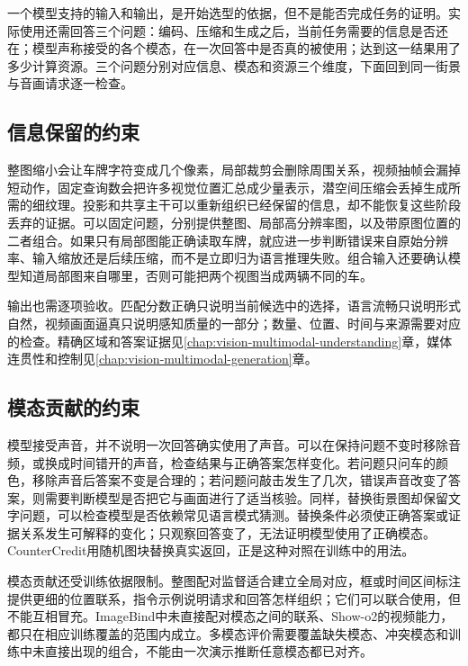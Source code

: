 一个模型支持的输入和输出，是开始选型的依据，但不是能否完成任务的证明。实际使用还需回答三个问题：编码、压缩和生成之后，当前任务需要的信息是否还在；模型声称接受的各个模态，在一次回答中是否真的被使用；达到这一结果用了多少计算资源。三个问题分别对应信息、模态和资源三个维度，下面回到同一街景与音画请求逐一检查。

\subsection{信息保留的约束}
\label{sec:vision-models-information}

整图缩小会让车牌字符变成几个像素，局部裁剪会删除周围关系，视频抽帧会漏掉短动作，固定查询数会把许多视觉位置汇总成少量表示，潜空间压缩会丢掉生成所需的细纹理。投影和共享主干可以重新组织已经保留的信息，却不能恢复这些阶段丢弃的证据。可以固定问题，分别提供整图、局部高分辨率图，以及带原图位置的二者组合。如果只有局部图能正确读取车牌，就应进一步判断错误来自原始分辨率、输入缩放还是后续压缩，而不是立即归为语言推理失败。组合输入还要确认模型知道局部图来自哪里，否则可能把两个视图当成两辆不同的车。

输出也需逐项验收。匹配分数正确只说明当前候选中的选择，语言流畅只说明形式自然，视频画面逼真只说明感知质量的一部分；数量、位置、时间与来源需要对应的检查。精确区域和答案证据见\ref{chap:vision-multimodal-understanding}章，媒体连贯性和控制见\ref{chap:vision-multimodal-generation}章。

\subsection{模态贡献的约束}
\label{sec:vision-models-modality-contribution}

模型接受声音，并不说明一次回答确实使用了声音。可以在保持问题不变时移除音频，或换成时间错开的声音，检查结果与正确答案怎样变化。若问题只问车的颜色，移除声音后答案不变是合理的；若问题问敲击发生了几次，错误声音改变了答案，则需要判断模型是否把它与画面进行了适当核验。同样，替换街景图却保留文字问题，可以检查模型是否依赖常见语言模式猜测。替换条件必须使正确答案或证据关系发生可解释的变化；只观察回答变了，无法证明模型使用了正确模态。CounterCredit用随机图块替换真实返回，正是这种对照在训练中的用法。

模态贡献还受训练依据限制。整图配对监督适合建立全局对应，框或时间区间标注提供更细的位置联系，指令示例说明请求和回答怎样组织；它们可以联合使用，但不能互相冒充。ImageBind中未直接配对模态之间的联系、Show-o2的视频能力，都只在相应训练覆盖的范围内成立。多模态评价需要覆盖缺失模态、冲突模态和训练中未直接出现的组合，不能由一次演示推断任意模态都已对齐。

